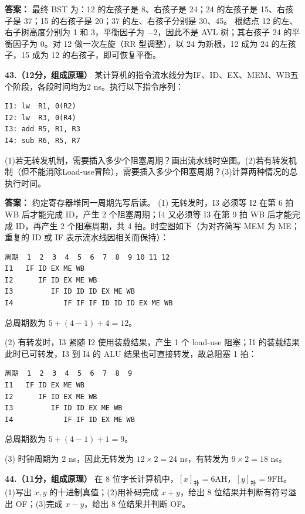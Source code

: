 \ifshowsolutions\par\noindent\textbf{答案：} 最终 BST 为：12 的左孩子是 8、右孩子是 24；24 的左孩子是 15、右孩子是 37；15 的右孩子是 20；37 的左、右孩子分别是 30、45。
根结点 12 的左、右子树高度分别为 1 和 3，平衡因子为 $-2$，因此不是 AVL 树；其右孩子 24 的平衡因子为 0。对 12 做一次左旋（RR 型调整），以 24 为新根，12 成为 24 的左孩子，15 成为 12 的右孩子，即可恢复平衡。\else \answerarea[8] \fi

\vspace{8pt}

\noindent\textbf{43.（12分，组成原理）} 某计算机的指令流水线分为IF、ID、EX、MEM、WB五个阶段，各段时间均为2 ns。执行以下指令序列：
\begin{lstlisting}
I1: lw  R1, 0(R2)
I2: lw  R3, 0(R4)
I3: add R5, R1, R3
I4: sub R6, R5, R7
\end{lstlisting}
(1)若无转发机制，需要插入多少个阻塞周期？画出流水线时空图。(2)若有转发机制（但不能消除Load-use冒险），需要插入多少个阻塞周期？(3)计算两种情况的总执行时间。

\ifshowsolutions\par\noindent\textbf{答案：} 约定寄存器堆同一周期先写后读。
(1) 无转发时，I3 必须等 I2 在第 6 拍 WB 后才能完成 ID，产生 2 个阻塞周期；I4 又必须等 I3 在第 9 拍 WB 后才能完成 ID，再产生 2 个阻塞周期，共 4 拍。时空图如下（为对齐简写 MEM 为 ME；重复的 ID 或 IF 表示流水线因相关而保持）：
\begin{lstlisting}
周期  1  2  3  4  5  6  7  8  9 10 11 12
I1   IF ID EX ME WB
I2      IF ID EX ME WB
I3         IF ID ID ID EX ME WB
I4            IF IF IF ID ID ID EX ME WB
\end{lstlisting}
总周期数为 $5+(4-1)+4=12$。

(2) 有转发时，I3 紧随 I2 使用装载结果，产生 1 个 load-use 阻塞；I1 的装载结果此时已可转发，I3 到 I4 的 ALU 结果也可直接转发，故总阻塞 1 拍：
\begin{lstlisting}
周期  1  2  3  4  5  6  7  8  9
I1   IF ID EX ME WB
I2      IF ID EX ME WB
I3         IF ID ID EX ME WB
I4            IF IF ID EX ME WB
\end{lstlisting}
总周期数为 $5+(4-1)+1=9$。

(3) 时钟周期为 2 ns，因此无转发为 $12\times2=24$ ns，有转发为 $9\times2=18$ ns。\else \answerarea[8] \fi

\vspace{8pt}

\noindent\textbf{44.（11分，组成原理）} 在 8 位字长计算机中，$[x]_{\text{补}}=6\text{AH}$，$[y]_{\text{补}}=9\text{FH}$。(1)写出 $x,y$ 的十进制真值；(2)用补码完成 $x+y$，给出 8 位结果并判断有符号溢出 OF；(3)完成 $x-y$，给出 8 位结果并判断 OF。

